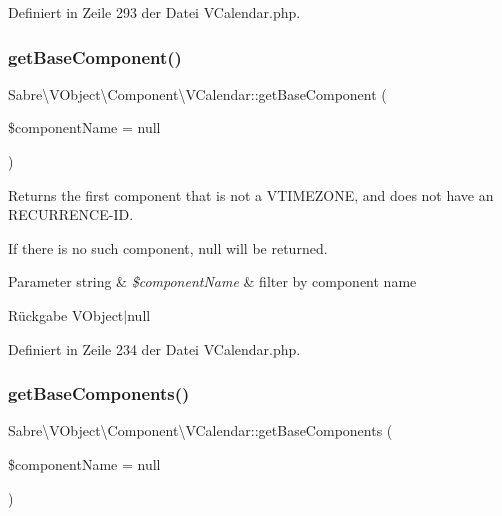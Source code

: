 Definiert in Zeile 293 der Datei V\+Calendar.\+php.

\mbox{\label{class_sabre_1_1_v_object_1_1_component_1_1_v_calendar_acac200821a9ed220efc0430603355658}} 
\subsubsection{\texorpdfstring{get\+Base\+Component()}{getBaseComponent()}}
{\footnotesize\ttfamily Sabre\textbackslash{}\+V\+Object\textbackslash{}\+Component\textbackslash{}\+V\+Calendar\+::get\+Base\+Component (\begin{DoxyParamCaption}\item[{}]{\$component\+Name = {\ttfamily null} }\end{DoxyParamCaption})}

Returns the first component that is not a V\+T\+I\+M\+E\+Z\+O\+NE, and does not have an R\+E\+C\+U\+R\+R\+E\+N\+C\+E-\/\+ID.

If there is no such component, null will be returned.


\begin{DoxyParams}[1]{Parameter}
string & {\em \$component\+Name} & filter by component name\\
\hline
\end{DoxyParams}
\begin{DoxyReturn}{Rückgabe}
V\+Object$\vert$null 
\end{DoxyReturn}


Definiert in Zeile 234 der Datei V\+Calendar.\+php.

\mbox{\label{class_sabre_1_1_v_object_1_1_component_1_1_v_calendar_aa097c5e50f722fff232ed43160e48176}} 
\subsubsection{\texorpdfstring{get\+Base\+Components()}{getBaseComponents()}}
{\footnotesize\ttfamily Sabre\textbackslash{}\+V\+Object\textbackslash{}\+Component\textbackslash{}\+V\+Calendar\+::get\+Base\+Components (\begin{DoxyParamCaption}\item[{}]{\$component\+Name = {\ttfamily null} }\end{DoxyParamCaption})}

